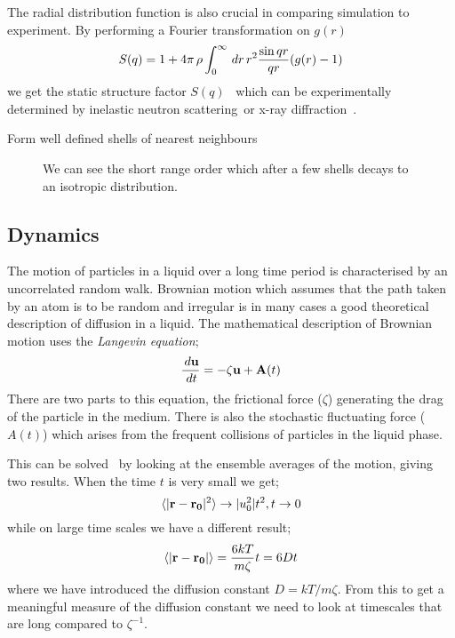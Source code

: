 The radial distribution function is also crucial in comparing simulation to experiment. By performing a Fourier transformation on $g(r)$
\begin{equation}
    S(q) = 1 + 4\pi\,\rho \int^\infty_0 \,d r\,r^2 \frac{\sin{qr}}{qr} (g(r)-1)
\end{equation}
we get the static structure factor $S(q)$~\cite{allen:87,hansen:86} which can be experimentally determined by inelastic neutron scattering~\tocite or x-ray diffraction~\tocite.

Form well defined shells of nearest neighbours~\cite[p2]{barrat:03}
\begin{figure}
    \label{fig:radial distribution}
    \caption{We can see the short range order which after a few shells decays to an isotropic distribution.}
\end{figure}

\subsection{Dynamics}
The motion of particles in a liquid over a long time period is characterised by an uncorrelated random walk. Brownian motion which assumes that the path taken by an atom is to be random and irregular is in many cases a good theoretical description of diffusion in a liquid. The mathematical description of Brownian motion uses the \emph{Langevin equation};
\begin{equation}
    \frac{\,d \mathbf{u}}{\,d t} = - \zeta \mathbf{u} + \mathbf{A}(t)
\end{equation}
There are two parts to this equation, the frictional force ($\zeta$) generating the drag of the particle in the medium. There is also the stochastic fluctuating force ($A(t)$) which arises from the frequent collisions of particles in the liquid phase.

This can be solved~\cite{mcquarrie:76} by looking at the ensemble averages of the motion, giving two results. When the time $t$ is very small we get;
\begin{equation}
    \langle | \mathbf{r} - \mathbf{r_0}|^2 \rangle \rightarrow |u_0^2|t^2,   t \rightarrow 0
\end{equation}
while on large time scales we have a different result;
\begin{equation}
    \langle | \mathbf{r} - \mathbf{r_0} | \rangle = \frac{6kT}{m\zeta} t = 6Dt
\end{equation}
where we have introduced the diffusion constant $D = kT/m\zeta$. From this to get a meaningful measure of the diffusion constant we need to look at timescales that are long compared to $\zeta^{-1}$.


